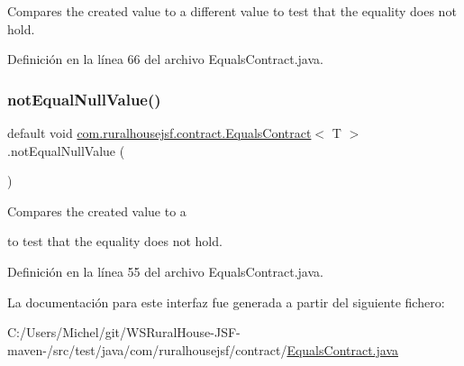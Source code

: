 Compares the created value to a different value to test that the equality does not hold. 

Definición en la línea 66 del archivo Equals\+Contract.\+java.

\mbox{\label{interfacecom_1_1ruralhousejsf_1_1contract_1_1_equals_contract_adda6a50dc1babeb3783fd92a09aac788}} 
\subsubsection{\texorpdfstring{notEqualNullValue()}{notEqualNullValue()}}
{\footnotesize\ttfamily default void \mbox{\hyperlink{interfacecom_1_1ruralhousejsf_1_1contract_1_1_equals_contract}{com.\+ruralhousejsf.\+contract.\+Equals\+Contract}}$<$ T $>$.not\+Equal\+Null\+Value (\begin{DoxyParamCaption}{ }\end{DoxyParamCaption})}

Compares the created value to a
\begin{DoxyCode}{0}
\DoxyCodeLine{\textcolor{keyword}{null} }
\end{DoxyCode}
 to test that the equality does not hold. 

Definición en la línea 55 del archivo Equals\+Contract.\+java.



La documentación para este interfaz fue generada a partir del siguiente fichero\+:\begin{DoxyCompactItemize}
\item 
C\+:/\+Users/\+Michel/git/\+W\+S\+Rural\+House-\/\+J\+S\+F-\/maven-\//src/test/java/com/ruralhousejsf/contract/\mbox{\hyperlink{_equals_contract_8java}{Equals\+Contract.\+java}}\end{DoxyCompactItemize}
